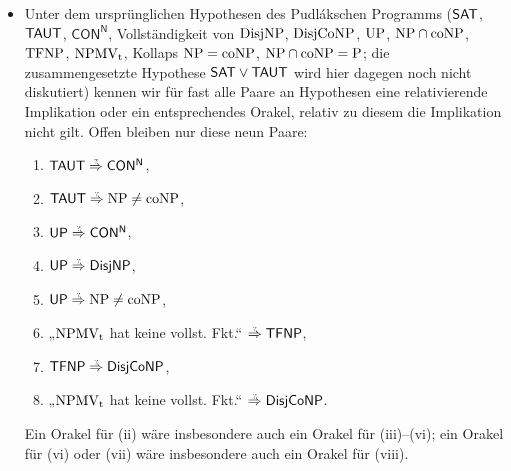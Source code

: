 \begin{itemize}[parsep=0pt,listparindent=\parindent,itemsep=5pt plus 1pt minus 1pt,midpenalty=0]
    \item Unter dem ursprünglichen Hypothesen des Pudlákschen Programms ($\mathsf{SAT}$, $ \mathsf{TAUT}$, $ \mathsf{CON^N}$, Vollständigkeit von $\mathrm{DisjNP}$, $ \mathrm{DisjCoNP}$, $ \mathrm{UP}$, $ \mathrm{NP}\cap\mathrm{coNP}$, $ \mathrm{TFNP}$, $ \mathrm{NPMV_t}$, Kollaps $\mathrm{NP}=\mathrm{coNP}$, $\mathrm{NP}\cap\mathrm{coNP}=\mathrm{P}$; die zusammengesetzte Hypothese $\mathsf{SAT}\lor\mathsf{TAUT}$ wird hier dagegen noch nicht diskutiert) kennen wir für fast alle Paare an Hypothesen eine relativierende Implikation oder ein entsprechendes Orakel, relativ zu diesem die Implikation nicht gilt. Offen bleiben nur diese neun Paare:
        \begin{enumerate}[noitemsep,midpenalty=0,label=(\roman*)]
            \item $\hTAUT\stackrel{\smash{\text{\raisebox{-1pt}{\tiny ?}}}}{\Rightarrow}\mathsf{CON^N}$,
            \item $\hTAUT\stackrel{\smash{\text{\raisebox{-1pt}{\tiny ?}}}}{\Rightarrow}\NP\neq\coNP$,
            \item $\hUP\stackrel{\smash{\text{\raisebox{-1pt}{\tiny ?}}}}{\Rightarrow}\mathsf{CON^N}$,
            \item $\hUP\stackrel{\smash{\text{\raisebox{-1pt}{\tiny ?}}}}{\Rightarrow}\hDisjNP$,
            \item $\hUP\stackrel{\smash{\text{\raisebox{-1pt}{\tiny ?}}}}{\Rightarrow}\NP\neq\coNP$,
            \item „$\mathrm{NPMV_t}$ hat keine vollst. Fkt.“ $\stackrel{\smash{\text{\raisebox{-1pt}{\tiny ?}}}}{\Rightarrow} \hTFNP$,
            \item $\hTFNP\stackrel{\smash{\text{\raisebox{-1pt}{\tiny ?}}}}{\Rightarrow} \hDisjCoNP$,
            \item „$\mathrm{NPMV_t}$ hat keine vollst. Fkt.“ $\stackrel{\smash{\text{\raisebox{-1pt}{\tiny ?}}}}{\Rightarrow} \hDisjCoNP$.

        \end{enumerate}
        Ein Orakel für (ii) wäre insbesondere auch ein Orakel für (iii)–(vi); ein Orakel für (vi) oder (vii) wäre insbesondere auch ein Orakel für (viii).
        

\end{itemize}

